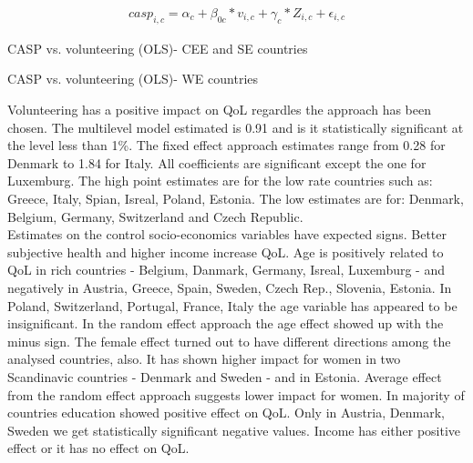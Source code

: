 \documentclass[10pt, letterpaper]{article}
\begin{document}
\begin{spacing}{1.4}
  \begin{eqnarray}
	casp_{i,c}= \alpha_{c}+ \beta_{0c}*v_{i,c} + \gamma_{c}*Z_{i,c} + \epsilon_{i,c}
 \end{eqnarray}


\begin{spacing}{.9}
\begin{table}[H]
\centering 
\caption{CASP vs. volunteering (OLS)- CEE and SE countries}  
\begin{small} 
	 
      \label{pooling} 
\end{small}
\end{table}
\end{spacing}

\begin{spacing}{.9}
\begin{table}[H]
\centering 
\caption{CASP vs. volunteering (OLS)- WE countries}  
\begin{small} 
	 
      \label{pooling} 
\end{small}
\end{table}
\end{spacing}

Volunteering has a positive impact on QoL regardles the approach has been chosen. The multilevel model estimated is 0.91 and is it statistically significant at the level less than 1\%. The fixed effect approach estimates range from 0.28 for Denmark to 1.84 for Italy. All coefficients are significant except the one for Luxemburg. The high point estimates are for the low rate countries such as: Greece, Italy, Spian, Isreal, Poland, Estonia. The low estimates are for: Denmark, Belgium, Germany, Switzerland and Czech Republic. \\

Estimates on the control socio-economics variables have expected signs. Better subjective health and higher income increase QoL. Age is positively related to QoL in rich countries - Belgium, Danmark, Germany, Isreal, Luxemburg - and negatively in Austria, Greece, Spain, Sweden, Czech Rep.,  Slovenia, Estonia. In Poland, Switzerland, Portugal, France, Italy the age variable has appeared to be insignificant. In the random effect approach the age effect  showed up with the minus sign. The female effect turned out to have different directions among the analysed countries, also.  It has shown higher impact for women in two Scandinavic countries - Denmark and Sweden - and in Estonia. Average effect from the random effect approach suggests lower impact for women. In majority of countries education showed positive effect on QoL. Only in Austria, Denmark, Sweden we get statistically significant negative values. Income has either positive effect or it has no effect on QoL. \\ 


\end{spacing}
\end{document}
